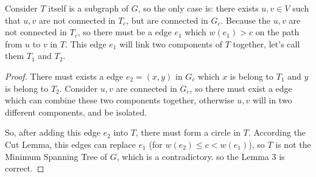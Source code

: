 Consider $T$ itself is a subgraph of $G$, so the only case is: there exists $u, v \in V$ such that $u, v$ are not connected in $T_c$, but are connected in $G_c$. Because the $u, v$ are not connected in $T_c$, so there must be a edge $e_1$ which $w(e_1) > c$ on the path from $u$ to $v$ in $T$. This edge $e_1$ will link two components of $T$ together, let's call them $T_{1}$ and $T_{2}$.

\begin{proof}
There must exists a edge $e_2 = (x, y)$ in $G_{c}$ which $x$ is belong to $T_{1}$ and $y$ is belong to $T_{2}$.
Consider $u, v$ are connected in $G_{c}$, so there must exist a edge which can combine these two components together, otherwise $u, v$ will in two different components, and be isolated.

So, after adding this edge $e_2$ into $T$, there must form a circle in $T$. According the Cut Lemma, this edges can replace $e_1$ (for $w(e_2) \leq c < w(e_1)$), so $T$ is not the Minimum Spanning Tree of $G$, which is a contradictory. so the Lemma 3 is correct. 
\end{proof}

